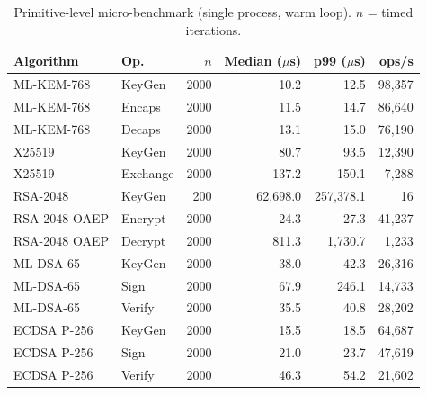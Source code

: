 \begin{table}[t]
\centering
\caption{Primitive-level micro-benchmark (single process, warm loop). $n$ = timed iterations.}
\label{tab:primitives}
\setlength{\tabcolsep}{3pt}
\footnotesize
\begin{tabular}{@{}llrrrr@{}}
\toprule
Algorithm & Op. & $n$ & Median ($\mu$s) & p99 ($\mu$s) & ops/s \\
\midrule
ML-KEM-768 & KeyGen & 2000 & 10.2 & 12.5 & 98,357 \\
ML-KEM-768 & Encaps & 2000 & 11.5 & 14.7 & 86,640 \\
ML-KEM-768 & Decaps & 2000 & 13.1 & 15.0 & 76,190 \\
\addlinespace
X25519 & KeyGen & 2000 & 80.7 & 93.5 & 12,390 \\
X25519 & Exchange & 2000 & 137.2 & 150.1 & 7,288 \\
\addlinespace
RSA-2048 & KeyGen & 200 & 62,698.0 & 257,378.1 & 16 \\
RSA-2048 OAEP & Encrypt & 2000 & 24.3 & 27.3 & 41,237 \\
RSA-2048 OAEP & Decrypt & 2000 & 811.3 & 1,730.7 & 1,233 \\
\addlinespace
ML-DSA-65 & KeyGen & 2000 & 38.0 & 42.3 & 26,316 \\
ML-DSA-65 & Sign & 2000 & 67.9 & 246.1 & 14,733 \\
ML-DSA-65 & Verify & 2000 & 35.5 & 40.8 & 28,202 \\
\addlinespace
ECDSA P-256 & KeyGen & 2000 & 15.5 & 18.5 & 64,687 \\
ECDSA P-256 & Sign & 2000 & 21.0 & 23.7 & 47,619 \\
ECDSA P-256 & Verify & 2000 & 46.3 & 54.2 & 21,602 \\
\bottomrule
\end{tabular}
\end{table}
